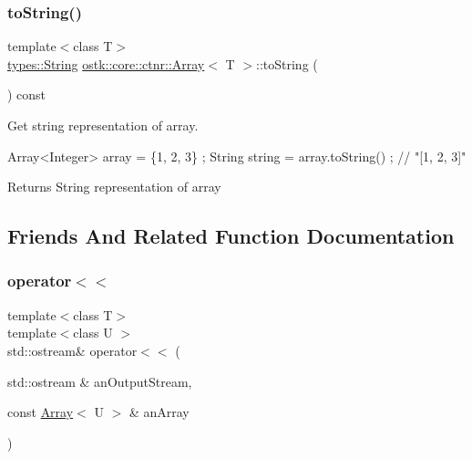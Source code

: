 \subsubsection{\texorpdfstring{to\+String()}{toString()}}
{\footnotesize\ttfamily template$<$class T$>$ \\
\hyperlink{classostk_1_1core_1_1types_1_1_string}{types\+::\+String} \hyperlink{classostk_1_1core_1_1ctnr_1_1_array}{ostk\+::core\+::ctnr\+::\+Array}$<$ T $>$\+::to\+String (\begin{DoxyParamCaption}{ }\end{DoxyParamCaption}) const}



Get string representation of array. 


\begin{DoxyCode}
Array<Integer> array = \{1, 2, 3\} ;
String \textcolor{keywordtype}{string} = array.toString() ; \textcolor{comment}{// "[1, 2, 3]"}
\end{DoxyCode}


\begin{DoxyReturn}{Returns}
String representation of array 
\end{DoxyReturn}


\subsection{Friends And Related Function Documentation}
\mbox{\label{classostk_1_1core_1_1ctnr_1_1_array_a9daa2d638e5bd693776f8bf6caae0802}} 
\subsubsection{\texorpdfstring{operator$<$$<$}{operator<<}}
{\footnotesize\ttfamily template$<$class T$>$ \\
template$<$class U $>$ \\
std\+::ostream\& operator$<$$<$ (\begin{DoxyParamCaption}\item[{std\+::ostream \&}]{an\+Output\+Stream,  }\item[{const \hyperlink{classostk_1_1core_1_1ctnr_1_1_array}{Array}$<$ U $>$ \&}]{an\+Array }\end{DoxyParamCaption})\hspace{0.3cm}{\ttfamily [friend]}}



